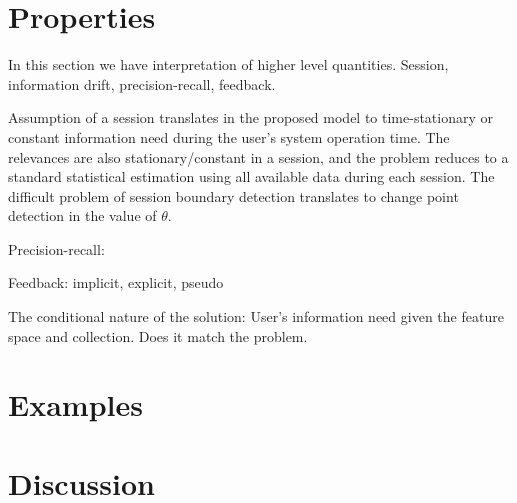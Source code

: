 \documentclass[10pt]{tufte-handout}
\begin{document}
\section{Properties}

In this section we have interpretation of higher level quantities. Session, information drift, precision-recall, feedback.

Assumption of a session translates in the proposed model to time-stationary or constant information need during the  user's system operation time. The relevances are  also stationary/constant in a session, and the problem reduces to a standard statistical estimation using all available data during each session. The difficult problem of session boundary detection translates to change point detection in the value of $\theta$.

Precision-recall:

Feedback: implicit, explicit, pseudo

The conditional nature of the solution: User's information need given the feature space and collection. Does it match the problem.

\section{Examples}

\section{Discussion}
\end{document}
